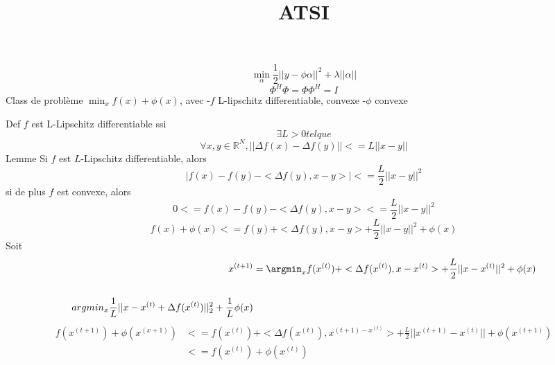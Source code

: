 \usepackage{amsmath}
\title{ATSI}
\maketitle


\begin{equation}
\min_\alpha \frac{1}{2}||y-\phi \alpha||^2+\lambda ||\alpha||
\end{equation}
\begin{equation}
\Phi^H\Phi = \Phi\Phi^H=I
\end{equation}
Class de probl\`eme $\min_x f(x)+\phi(x)$, avec 
-$f$ L-lipschitz differentiable, convexe
-$\phi$ convexe

Def $f$ est L-Lipschitz differentiable ssi
\begin{equation}
\exists L>0 tel que
\end{equation}
\begin{equation}
\forall x,y\in \mathbb{R}^N, ||\Delta f(x)-\Delta f(y)||<=L||x-y||
\end{equation}
Lemme Si $f$ est $L$-Lipschitz differentiable, alors
\begin{equation}
|f(x)-f(y)-<\Delta f(y),x-y>|<=\frac{L}{2}||x-y||^2
\end{equation}
si de plus $f$  est convexe, alors
\begin{equation}
0<=f(x)-f(y)-<\Delta f(y),x-y> <= \frac{L}{2}||x-y||^2
\end{equation}
\begin{equation}
f(x)+\phi(x)<=f(y)+<\Delta f(y),x-y>+\frac{L}{2}||x-y||^2+\phi(x)
\end{equation}
Soit
\begin{equation}
\begin{split}
x^{(t+1)}&=\argmin_x f(x^{(t)})+<\Delta f(x^{(t)}),x-x^{(t)}>+\frac{L}{2}||x-x^{(t)}||^2+\phi(x)\\
&\\argmin_x\frac{1}{L}||x-x^{(t)}+\Delta f(x^{(t)})||^2_2+\frac{1}{L}\phi(x)
\end{split}
\end{equation}
\begin{equation}
\begin{split}
f(x^{(t+1)})+\phi(x^{(x+1)})&<=f(x^{(t)})+<\Delta f(x^{(t)}),x^{(t+1)-x^{(t)}}> +\frac{L}{2}||x^{(t+1)}-x^{(t)}||+\phi(x^{(t+1)})\\
&<=f(x^{(t)})+\phi(x^{(t)})
\end{split}
\end{equation}

